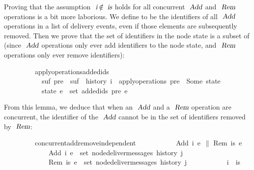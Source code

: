 Proving that the assumption $\isa{i} \mathbin{\isasymnotin} \isa{is}$ holds for all concurrent $\isa{Add}$ and $\isa{Rem}$ operations is a bit more laborious.
We define  to be the identifiers of all $\isa{Add}$ operations in a list of delivery events, even if those elements are subsequently removed.
Then we prove that the set of identifiers in the node state is a subset of  (since $\isa{Add}$ operations only ever add identifiers to the node state, and $\isa{Rem}$ operations only ever remove identifiers):
\vspace{0.275em}
\begin{isabellebody}
\ \ \ \ \ \ \ \ \ apply{\isacharunderscore}operations{\isacharunderscore}added{\isacharunderscore}ids{\isacharcolon}\isanewline
\ \ \ \ \ \ \ \ \ \ \ {\isachardoublequoteopen}{\isasymexists}suf{\isachardot}\ pre\ {\isacharat}\ suf\ {\isacharequal}\ history\ i{\isachardoublequoteclose}\ \ {\isachardoublequoteopen}apply{\isacharunderscore}operations\ pre\ {\isacharequal}\ Some\ state{\isachardoublequoteclose}\isanewline
\ \ \ \ \ \ \ \ \ \ \ {\isachardoublequoteopen}state\ e\ {\isasymsubseteq}\ set\ {\isacharparenleft}added{\isacharunderscore}ids\ pre\ e{\isacharparenright}{\isachardoublequoteclose}
\end{isabellebody}
\vspace{0.275em}
\noindent From this lemma, we deduce that when an $\isa{Add}$ and a $\isa{Rem}$ operation are concurrent, the identifier of the $\isa{Add}$ cannot be in the set of identifiers removed by $\isa{Rem}$:
\vspace{0.275em}
\begin{isabellebody}
\ \ \ \ \ \ \ \ \ concurrent{\isacharunderscore}add{\isacharunderscore}remove{\isacharunderscore}independent{\isacharcolon}\isanewline
\ \ \ \ \ \ \ \ \ \ \ {\isachardoublequoteopen}{\isacharparenleft}Add\ i\ e{}{\isacharparenright}\ $\|$ {\isacharparenleft}Rem\ is\ e{}{\isacharparenright}{\isachardoublequoteclose}\isanewline
\ \ \ \ \ \ \ \ \ \ \ \ \ {\isachardoublequoteopen}Add\ i\ e{}\ {\isasymin}\ set\ {\isacharparenleft}node{\isacharunderscore}deliver{\isacharunderscore}messages\ {\isacharparenleft}history\ j{\isacharparenright}{\isacharparenright}{\isachardoublequoteclose}\isanewline
\ \ \ \ \ \ \ \ \ \ \ \ \ {\isachardoublequoteopen}Rem\ is\ e{}\ {\isasymin}\ set\ {\isacharparenleft}node{\isacharunderscore}deliver{\isacharunderscore}messages\ {\isacharparenleft}history\ j{\isacharparenright}{\isacharparenright}{\isachardoublequoteclose}\isanewline
\ \ \ \ \ \ \ \ \ \ \ {\isachardoublequoteopen}i\ {\isasymnotin}\ is{\isachardoublequoteclose}
\end{isabellebody}
